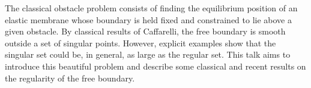 \newpage
{}
\begin{myabstract}   
The classical obstacle problem consists of finding the equilibrium position of an elastic membrane whose boundary is held fixed and constrained to lie above a given obstacle. By classical results of Caffarelli, the free boundary is smooth outside a set of singular points. However, explicit examples show that the singular set could be, in general, as large as the regular set. This talk aims to introduce this beautiful problem and describe some classical and recent results on the regularity of the free boundary.
\end{myabstract}

